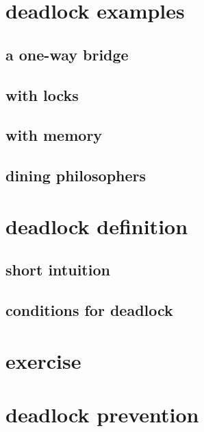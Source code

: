 

\section{deadlock examples}

\subsection{a one-way bridge}


\subsection{with locks}


\subsection{with memory}


\subsection{dining philosophers}

 
\section{deadlock definition}

\subsection{short intuition}



\subsection{conditions for deadlock}



\section{exercise}



\section{deadlock prevention}

